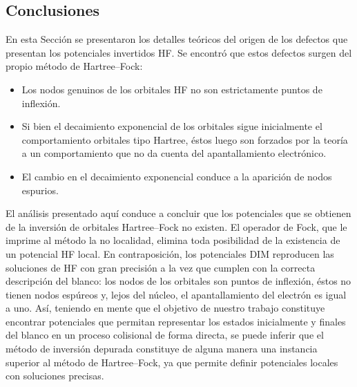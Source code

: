 \subsection{Conclusiones}

En esta Sección se presentaron los detalles teóricos del origen de los
defectos que presentan los potenciales invertidos HF. Se encontró que 
estos defectos surgen del propio método de Hartree--Fock: 
\begin{itemize}
\item Los nodos genuinos de los orbitales HF no son estrictamente puntos de inflexión.
\item Si bien el decaimiento exponencial de los orbitales sigue inicialmente el comportamiento orbitales tipo Hartree, éstos luego son forzados por la teoría a un comportamiento que no da cuenta del apantallamiento electrónico.
\item El cambio en el decaimiento exponencial conduce a la aparición de 
nodos espurios.
\end{itemize}
El análisis presentado aquí conduce a concluir que los potenciales que 
se obtienen de la inversión de orbitales Hartree--Fock no existen. El 
operador de Fock, que le imprime al método la no localidad, elimina toda 
posibilidad de la existencia de un potencial HF local. En 
contraposición, los potenciales DIM reproducen las soluciones de HF con 
gran precisión a la vez que cumplen con la correcta descripción del 
blanco: los nodos de los orbitales son puntos de inflexión, éstos no 
tienen nodos espúreos y, lejos del núcleo, el apantallamiento del 
electrón es igual a uno. Así, teniendo en mente que el objetivo de 
nuestro trabajo constituye encontrar potenciales que permitan 
representar los estados inicialmente y finales del blanco en un proceso 
colisional de forma directa, se puede inferir que el método de inversión 
depurada constituye de alguna manera una instancia superior al método de 
Hartree--Fock, ya que permite definir potenciales locales con soluciones 
precisas.



